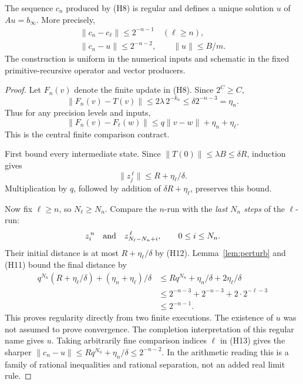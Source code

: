 \begin{theorem}
\label{thm:hilbert-solver}
The sequence \(c_n\) produced by (H8) is regular and defines a unique
solution \(u\) of \(Au=b_\infty\). More precisely,
\[
\begin{gathered}
       \|c_n-c_\ell\|\leq2^{-n-1}\quad(\ell\geq n),\\
       \|c_n-u\|\leq2^{-n-2},\qquad
       \|u\|\leq B/m.
\end{gathered}
\tag{H9}
\]
The construction is uniform in the numerical inputs and schematic in the
fixed primitive-recursive operator and vector producers.
\end{theorem}
\begin{proof}
Let \(F_n(v)\) denote the finite update in (H8). Since \(2^C\geq C\),
\[
 \|F_n(v)-T(v)\|\leq2\lambda\,2^{-k_n}
                  \leq\delta2^{-n-3}=\eta_n.
 \tag{H10}
\]
Thus for any precision levels and inputs,
\[
\|F_n(v)-F_\ell(w)\|
 \leq q\|v-w\|+\eta_n+\eta_\ell .
\tag{H11}
\]
This is the central finite comparison contract.

First bound every intermediate state. Since
\(\|T(0)\|\leq\lambda B\leq\delta R\), induction gives
\[
\|z^{\,\ell}_j\|\leq R+\eta_\ell/\delta.
\tag{H12}
\]
Multiplication by \(q\), followed by addition of
\(\delta R+\eta_\ell\), preserves this bound.

Now fix \(\ell\geq n\), so \(N_\ell\geq N_n\).
Compare the \(n\)-run with the \emph{last \(N_n\) steps} of the \(\ell\)-run:
\[
             z^{\,n}_i
       \quad\hbox{and}\quad z^{\,\ell}_{N_\ell-N_n+i},
                    \qquad 0\leq i\leq N_n.
\]
Their initial distance is at most \(R+\eta_\ell/\delta\) by (H12).
Lemma~\ref{lem:perturb} and (H11) bound the final distance by
\[
\begin{split}
q^{N_n}(R+\eta_\ell/\delta)+(\eta_n+\eta_\ell)/\delta
 &\leq Rq^{N_n}+\eta_n/\delta+2\eta_\ell/\delta\\
 &\leq2^{-n-3}+2^{-n-3}+2\cdot2^{-\ell-3}\\
 &\leq2^{-n-1}.
\end{split}
\tag{H13}
\]
This proves regularity directly from two finite executions. The existence of
\(u\) was not assumed to prove convergence. The completion interpretation
of this regular name gives \(u\).
Taking arbitrarily fine comparison indices \(\ell\) in (H13) gives the sharper
\(\|c_n-u\|\leq Rq^{N_n}+\eta_n/\delta\leq2^{-n-2}\).
In the arithmetic reading this is a family of rational inequalities and
rational separation, not an added real limit rule.


\end{proof}
